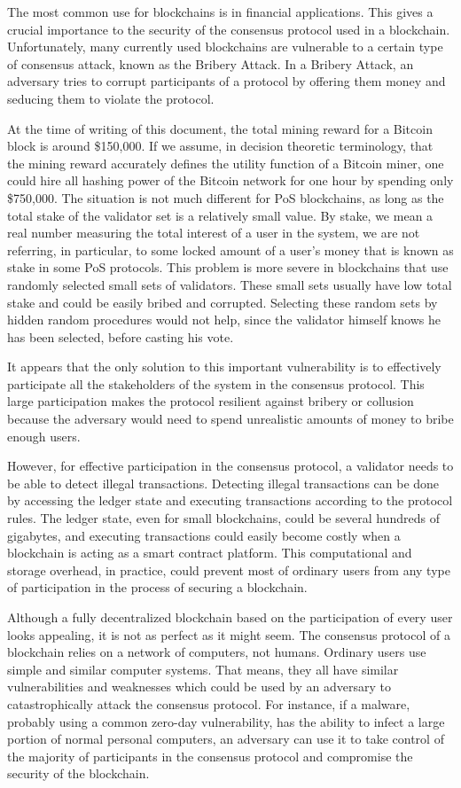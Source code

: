 The most common use for blockchains is in financial applications. This gives a crucial importance to the
security of the consensus protocol used in a blockchain. Unfortunately, many currently used blockchains are
vulnerable to a certain type of consensus attack, known as the Bribery Attack. In a Bribery Attack, an adversary
tries to corrupt participants of a protocol by offering them money and seducing them to violate the protocol.

At the time of writing of this document,
the total mining reward for a Bitcoin block is around \$150,000. If we assume, in decision theoretic terminology,
that the mining reward accurately defines the utility function of a Bitcoin miner, one could hire all hashing power
of the Bitcoin network for one hour by
spending only \$750,000. The situation is not much different for PoS blockchains, as long as the total
stake of the validator set is a relatively small value. By
stake, we mean a real number measuring the total interest of a user in the system, we are not referring, in
particular, to some locked amount of a user's money that is known as stake in some PoS protocols.
This problem is more severe in blockchains that use randomly selected small sets of validators. These small sets
usually have low total stake and could be easily bribed and corrupted. Selecting these random sets
by hidden random procedures would not help, since the validator himself knows he has been selected, before casting
his vote.

It appears that the only solution to this important vulnerability is to effectively participate all the stakeholders
of the system in the consensus protocol. This large participation makes the protocol resilient against bribery or
collusion because the adversary would need to spend unrealistic amounts of money to bribe enough users.

However, for effective participation in the consensus protocol, a validator needs to be able to detect
illegal transactions. Detecting illegal transactions can be done by accessing the ledger
state and executing transactions according to the protocol rules. The
ledger state, even for small blockchains, could be several
hundreds of gigabytes, and executing transactions could easily become costly when a blockchain is acting as a
smart contract platform. This computational and storage overhead, in practice, could prevent most of
ordinary users from any type of participation in the process of securing a blockchain.

Although a fully decentralized blockchain based on the participation of every user looks appealing, it is not as perfect
as it might seem. The consensus protocol of a blockchain relies on a network of computers, not humans. Ordinary users
use simple and similar computer systems. That means, they all have similar vulnerabilities and weaknesses which could be
used by an adversary to catastrophically attack the consensus protocol. For instance, if a malware, probably using a
common zero-day
vulnerability, has the ability to infect a large portion of normal personal computers, an adversary can use it to
take control of the majority of participants in the consensus protocol and compromise the security of the
blockchain.


